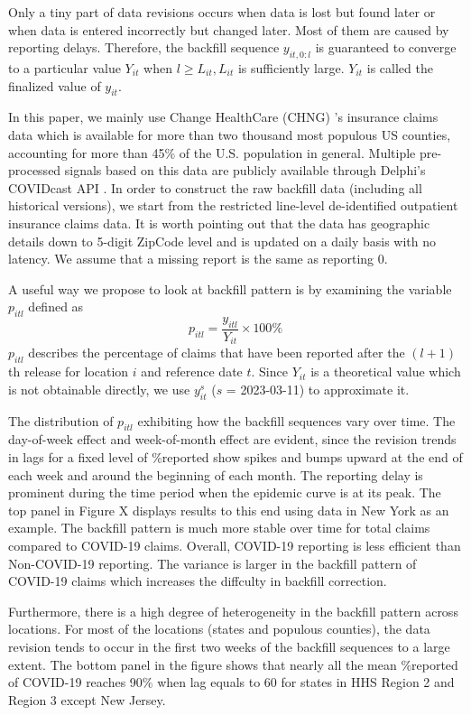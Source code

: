 Only a tiny part of data revisions occurs when data is lost but found later or when data is entered incorrectly but changed later. Most of them are caused by reporting delays. Therefore, the backfill sequence $y_{it,0:l}$ is guaranteed to converge to a particular value $Y_{it}$ when $l \geq L_{it}, L_{it}$ is sufficiently large. $Y_{it}$ is called the finalized value of $y_{it}$.

In this paper, we mainly use Change HealthCare (CHNG) 's insurance claims data which is available for more than two thousand most populous US counties, accounting for more than 45\% of the U.S. population in general. Multiple pre-processed signals based on this data are publicly available through Delphi's COVIDcast API \cite{reinhart2021open}. In order to construct the raw backfill data (including all historical versions), we start from the restricted line-level de-identified outpatient insurance claims data. It is worth pointing out that the data has geographic details down to 5-digit ZipCode level and is updated on a daily basis with no latency. We assume that a missing report is the same as reporting 0.

A useful way we propose to look at backfill pattern is by examining the variable $p_{itl}$ defined as $$p_{itl} = \frac{y_{itl}}{Y_{it}} \times 100\%$$
$p_{itl}$ describes the percentage of claims that have been reported after the $(l+1)$th release for location $i$ and reference date $t$. Since $Y_{it}$ is a theoretical value which is not obtainable directly, we use $y_{it}^s$ ($s$ = 2023-03-11) to approximate it. 

The distribution of $p_{itl}$ exhibiting how the backfill sequences vary over time. The day-of-week effect and week-of-month effect are evident, since the revision trends in lags for a fixed level of \%reported show spikes and bumps upward at the end of each week and around the beginning of each month. The reporting delay is prominent during the time period when the epidemic curve is at its peak. The top panel in Figure X displays results to this end using data in New York as an example. The backfill pattern is much more stable over time for total claims compared to COVID-19 claims. Overall, COVID-19 reporting is less efficient than Non-COVID-19 reporting. The variance is larger in the backfill pattern of COVID-19 claims which increases the diffculty in backfill correction. 

Furthermore, there is a high degree of heterogeneity in the backfill pattern across locations. For most of the locations (states and populous counties), the data revision tends to occur in the first two weeks of the backfill sequences to a large extent. The bottom panel in the figure shows that nearly all the mean \%reported of COVID-19 reaches 90\% when lag equals to 60 for states in HHS Region 2 and Region 3 except New Jersey. 


